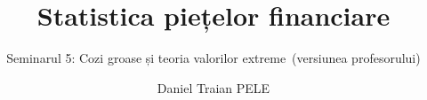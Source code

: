\title[Statistica piețelor financiare]{Statistica piețelor financiare}
\subtitle{Seminarul 5: Cozi groase și teoria valorilor extreme\ifsolutions\ (versiunea profesorului)\fi}
\author[D.T. Pele]{Daniel Traian PELE}
\date{}

\providecommand{\sfmapplink}[3]{\hypertarget{#2}{}\hyperlink{#1}{\beamergotobutton{#3}}}  %
\providecommand{\sfmappback}[2]{\begin{tikzpicture}[remember picture,overlay]\node[anchor=south east] at ([xshift=-3mm,yshift=7mm]current page.south east){\hyperlink{#1}{\beamerreturnbutton{#2}}};\end{tikzpicture}}  %
\providecommand{\sfmchlink}[2]{\href{#1}{#2}}  %
\providecommand{\sfmchlinkt}[2]{\href{#1}{\usebeamercolor[fg]{frametitle}#2}}  %


